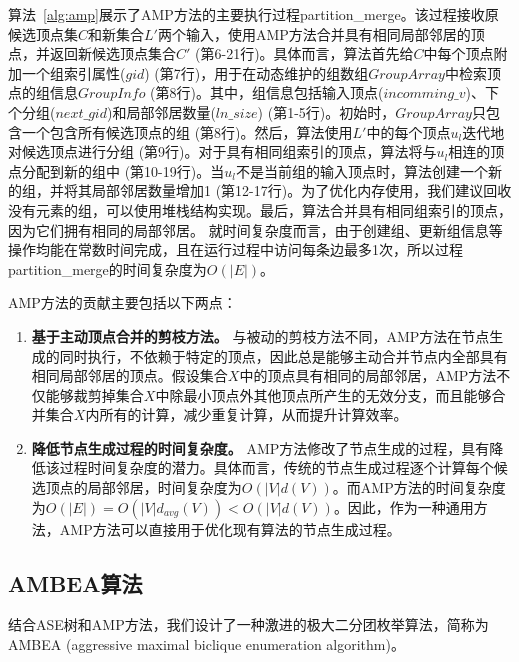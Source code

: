 算法~\ref{alg:amp}展示了AMP方法的主要执行过程\textsf{partition\_merge}。该过程接收原候选顶点集$C$和新集合$L'$两个输入，使用AMP方法合并具有相同局部邻居的顶点，并返回新候选顶点集合$C'$ (第6-21行)。具体而言，算法首先给$C$中每个顶点附加一个组索引属性($gid$) (第7行)，用于在动态维护的组数组$GroupArray$中检索顶点的组信息$GroupInfo$ (第8行)。其中，组信息包括输入顶点($incomming\_v$)、下个分组($next\_gid$)和局部邻居数量($ln\_size$) (第1-5行)。初始时，$GroupArray$只包含一个包含所有候选顶点的组 (第8行)。然后，算法使用$L'$中的每个顶点$u_l$迭代地对候选顶点进行分组 (第9行)。对于具有相同组索引的顶点，算法将与$u_l$相连的顶点分配到新的组中 (第10-19行)。当$u_l$不是当前组的输入顶点时，算法创建一个新的组，并将其局部邻居数量增加1 (第12-17行)。为了优化内存使用，我们建议回收没有元素的组，可以使用堆栈结构实现。最后，算法合并具有相同组索引的顶点，因为它们拥有相同的局部邻居。
就时间复杂度而言，由于创建组、更新组信息等操作均能在常数时间完成，且在运行过程中访问每条边最多1次，所以过程\textsf{partition\_merge}的时间复杂度为$O(|E|)$。

AMP方法的贡献主要包括以下两点：

\begin{enumerate}
  \item \textbf{基于主动顶点合并的剪枝方法。} 与被动的剪枝方法不同，AMP方法在节点生成的同时执行，不依赖于特定的顶点，因此总是能够主动合并节点内全部具有相同局部邻居的顶点。假设集合$X$中的顶点具有相同的局部邻居，AMP方法不仅能够裁剪掉集合$X$中除最小顶点外其他顶点所产生的无效分支，而且能够合并集合$X$内所有的计算，减少重复计算，从而提升计算效率。
  
  \item \textbf{降低节点生成过程的时间复杂度。} AMP方法修改了节点生成的过程，具有降低该过程时间复杂度的潜力。具体而言，传统的节点生成过程逐个计算每个候选顶点的局部邻居，时间复杂度为$O(|V|d(V))$。而AMP方法的时间复杂度为$O(|E|) =O(|V|d_{avg}(V)) < O(|V|d(V))$。因此，作为一种通用方法，AMP方法可以直接用于优化现有算法的节点生成过程。

\end{enumerate}

\subsection{AMBEA算法}
\label{subsec:ambea}
  结合ASE树和AMP方法，我们设计了一种激进的极大二分团枚举算法，简称为AMBEA (aggressive maximal biclique enumeration algorithm)。

